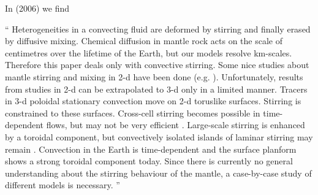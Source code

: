 In \textcite{gowh06} (2006) we find
\begin{displayquote}
{\color{darkgray}
``
Heterogeneities in a convecting ﬂuid are deformed by
stirring and ﬁnally erased by diffusive mixing. Chemical diﬀusion in mantle rock
acts on the scale of centimetres over the lifetime of the Earth, but our models
resolve km-scales. Therefore this paper deals only with convective stirring. Some
nice studies about mantle stirring and mixing in 2-d have been done (e.g. 
\cite{chri89,guda86b,kest91,ketu90,mebo95,olyb84,olyb84b,teyl96,teyp97,tepy98}).
Unfortunately, results from studies in 2-d can be extrapolated to 3-d only in a limited
manner. Tracers in 3-d poloidal stationary convection move on 2-d toruslike
surfaces. Stirring is constrained to these surfaces. Cross-cell stirring becomes possible
in time-dependent ﬂows, but may not be very efficient \cite{schh96}. Large-scale stirring is
enhanced by a toroidal component, but convectively isolated islands of laminar
stirring may remain \cite{feri98}. Convection in the Earth is time-dependent and the surface
planform shows a strong toroidal component today. Since there is currently no
general understanding about the stirring behaviour of the mantle, a case-by-case
study of different models is necessary.
''
}
\end{displayquote}


